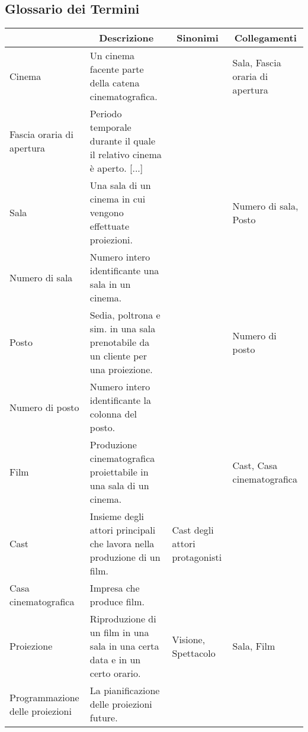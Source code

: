 \pagebreak

\subsection*{Glossario dei Termini}
%
%
\begin{longtable}{|p{3.86cm}|p{3.86cm}|p{3.86cm}|p{3.86cm}|}
      \hline
      \rowcolor{tblhdrcolor}
      \multicolumn{1}{|c|}{\textbf{Termine}}
       & \multicolumn{1}{|c|}{\textbf{Descrizione}}
       & \multicolumn{1}{|c|}{\textbf{Sinonimi}}
       & \multicolumn{1}{|c|}{\textbf{Collegamenti}}
      \\\hline
      Cinema
       & Un cinema facente parte della catena cinematografica.
       &
       & Sala, Fascia oraria di apertura
      \\\hline
      Fascia oraria di apertura
       & Periodo temporale durante il quale il relativo cinema è aperto. [...]
       &
       &
      \\ \hline
      Sala
       & Una sala di un cinema in cui vengono effettuate proiezioni.
       &
       & Numero di sala, Posto
      \\\hline
      Numero di sala
       & Numero intero identificante una sala in un cinema.
       &
       &
      \\\hline
      Posto
       & Sedia, poltrona e sim. in una sala prenotabile da un cliente
      per una proiezione.
       &
       & Numero di posto
      \\\hline
      Numero di posto
       & Numero intero identificante la colonna del posto.
       &
       &
      \\\hline
      Film
       & Produzione cinematografica proiettabile in una sala di un cinema.
       &
       & Cast, Casa cinematografica
      \\\hline
      Cast
       & Insieme degli attori principali che lavora nella produzione di un film.
       & Cast degli attori protagonisti
       &
      \\\hline
      Casa cinematografica
       & Impresa che produce film.
       &
       &
      \\ \hline
      Proiezione
       & Riproduzione di un film in una sala in una certa data e in un
      certo orario.
       & Visione, Spettacolo
       & Sala, Film
      \\ \hline
      Programmazione delle proiezioni
       & La pianificazione delle proiezioni future.

\end{longtable}
